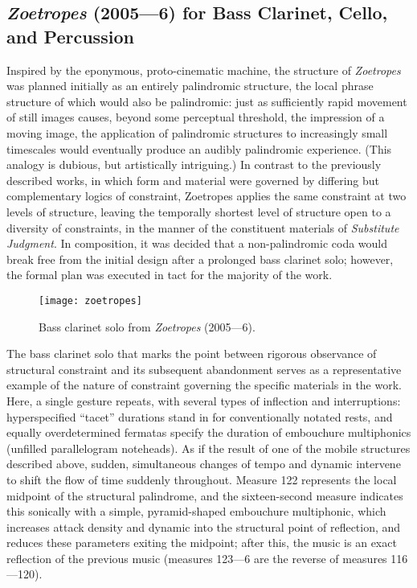 \subsection{\emph{Zoetropes} (2005---6) for Bass Clarinet, Cello, and Percussion}

Inspired by the eponymous, proto-cinematic machine, the structure of \emph{Zoetropes} was planned initially as an entirely palindromic structure, the local phrase structure of which would also be palindromic: just as sufficiently rapid movement of still images causes, beyond some perceptual threshold, the impression of a moving image, the application of palindromic structures to increasingly small timescales would eventually produce an audibly palindromic experience. (This analogy is dubious, but artistically intriguing.) In contrast to the previously described works, in which form and material were governed by differing but complementary logics of constraint, Zoetropes applies the same constraint at two levels of structure, leaving the temporally shortest level of structure open to a diversity of constraints, in the manner of the constituent materials of \emph{Substitute Judgment}. In composition, it was decided that a non-palindromic coda would break free from the initial design after a prolonged bass clarinet solo; however, the formal plan was executed in tact for the majority of the work.    

\begin{figure}[H] 
\texttt{[image: zoetropes]}
\caption{Bass clarinet solo from \emph{Zoetropes} (2005---6). } 
\end{figure}

The bass clarinet solo that marks the point between rigorous observance of structural constraint and its subsequent abandonment serves as a representative example of the nature of constraint governing the specific materials in the work. Here, a single gesture repeats, with several types of inflection and interruptions: hyperspecified ``tacet'' durations stand in for conventionally notated rests, and equally overdetermined fermatas specify the duration of embouchure multiphonics (unfilled parallelogram noteheads). As if the result of one of the mobile structures described above, sudden, simultaneous changes of tempo and dynamic intervene to shift the flow of time suddenly throughout. Measure 122 represents the local midpoint of the structural palindrome, and the sixteen-second measure indicates this sonically with a simple, pyramid-shaped embouchure multiphonic, which increases attack density and dynamic into the structural point of reflection, and reduces these parameters exiting the midpoint; after this, the music is an exact reflection of the previous music (measures 123---6 are the reverse of measures 116---120).

